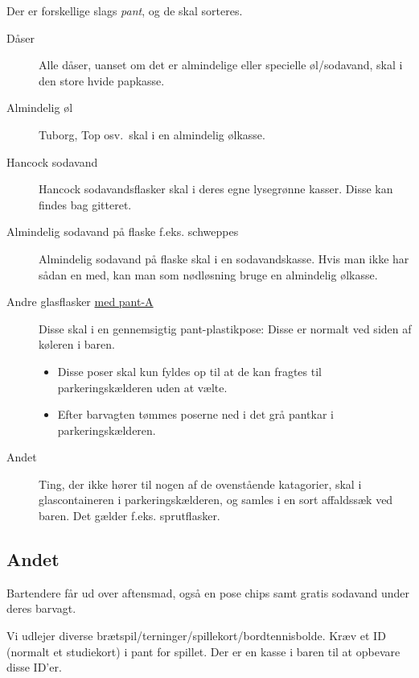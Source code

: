 Der er forskellige slags \textit{pant}, og de skal sorteres.
\begin{description}
\item[Dåser] Alle dåser, uanset om det er almindelige eller specielle
  øl/sodavand, skal i den store hvide papkasse.
\item[Almindelig øl] Tuborg, Top osv.\ skal i en almindelig ølkasse.
\item[Hancock sodavand] Hancock sodavandsflasker skal i deres egne lysegrønne kasser. Disse kan findes bag gitteret.
\item[Almindelig sodavand på flaske f.eks. schweppes] Almindelig sodavand på flaske skal i en
  sodavandskasse. Hvis man ikke har sådan en med, kan man som
  nødløsning bruge en almindelig ølkasse.%
\item[Andre glasflasker \underline{med pant-A}] Disse skal i en gennemsigtig
  pant-plastikpose: Disse er normalt ved siden af køleren i baren.
  \begin{itemize}
    \item Disse poser skal kun fyldes op til at de kan fragtes til parkeringskælderen uden at vælte.
    \item Efter barvagten tømmes poserne ned i det grå pantkar i parkeringskælderen.
  \end{itemize}
\item[Andet] Ting, der ikke hører til nogen af de ovenstående
  katagorier, skal i glascontaineren i parkeringskælderen, 
  og samles i en sort affaldssæk ved baren. Det gælder f.eks. sprutflasker.
\end{description}

\subsection{Andet}
\label{sec:intra:andet}

Bartendere får ud over aftensmad, også en pose chips samt gratis
sodavand under deres barvagt.

Vi udlejer diverse
brætspil/terninger/spillekort/bordtennisbolde. Kræv et ID (normalt et
studiekort) i pant for spillet. Der er en kasse i baren til at
opbevare disse ID'er.

